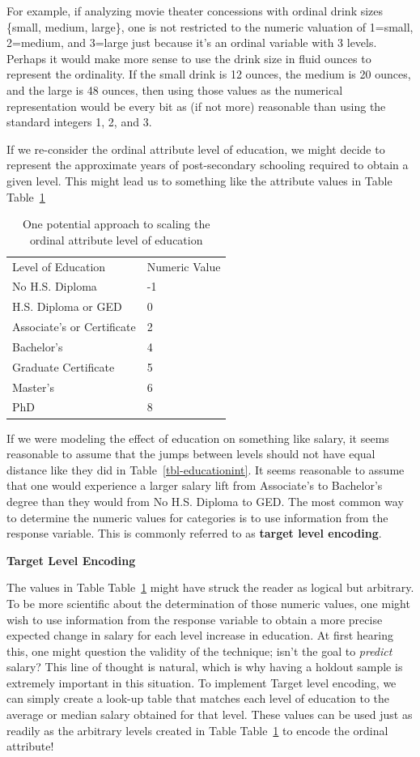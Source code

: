 \documentclass[
  letterpaper,
  DIV=11,
  numbers=noendperiod]{scrreprt}
\begin{document}
For example, if analyzing movie theater concessions with ordinal drink
sizes \{small, medium, large\}, one is not restricted to the numeric
valuation of 1=small, 2=medium, and 3=large just because it's an ordinal
variable with 3 levels. Perhaps it would make more sense to use the
drink size in fluid ounces to represent the ordinality. If the small
drink is 12 ounces, the medium is 20 ounces, and the large is 48 ounces,
then using those values as the numerical representation would be every
bit as (if not more) reasonable than using the standard integers 1, 2,
and 3.

If we re-consider the ordinal attribute level of education, we might
decide to represent the approximate years of post-secondary schooling
required to obtain a given level. This might lead us to something like
the attribute values in Table Table~\ref{tbl-educationscaled}

\hypertarget{tbl-educationscaled}{}
\begin{longtable}[]{@{}ll@{}}
\caption{\label{tbl-educationscaled}One potential approach to scaling
the ordinal attribute level of education}\tabularnewline
\toprule()
\endhead
Level of Education & Numeric Value \\
No H.S. Diploma & -1 \\
H.S. Diploma or GED & 0 \\
Associate's or Certificate & 2 \\
Bachelor's & 4 \\
Graduate Certificate & 5 \\
Master's & 6 \\
PhD & 8 \\
\bottomrule()
\end{longtable}

If we were modeling the effect of education on something like salary, it
seems reasonable to assume that the jumps between levels should not have
equal distance like they did in Table~\ref{tbl-educationint}. It seems
reasonable to assume that one would experience a larger salary lift from
Associate's to Bachelor's degree than they would from No H.S. Diploma to
GED. The most common way to determine the numeric values for categories
is to use information from the response variable. This is commonly
referred to as \textbf{target level encoding}.

\textbf{Target Level Encoding}

The values in Table Table~\ref{tbl-educationscaled} might have struck
the reader as logical but arbitrary. To be more scientific about the
determination of those numeric values, one might wish to use information
from the response variable to obtain a more precise expected change in
salary for each level increase in education. At first hearing this, one
might question the validity of the technique; isn't the goal to
\emph{predict} salary? This line of thought is natural, which is why
having a holdout sample is extremely important in this situation. To
implement Target level encoding, we can simply create a look-up table
that matches each level of education to the average or median salary
obtained for that level. These values can be used just as readily as the
arbitrary levels created in Table Table~\ref{tbl-educationscaled} to
encode the ordinal attribute!
\end{document}
